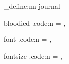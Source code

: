 \newif\ifjournalbloodied
\journalbloodiedfalse

\newcommand{\journalfont}{\entryfont}
\newcommand{\journalfontsize}{11pt}

\newlength{\journalwidth}
\setlength{\journalwidth}{0.9\textheight}

\newlength{\journaltextlength}
\setlength{\journaltextlength}{.35\journalwidth}

\newcommand{\leftsiderotation}{1}
\newlength{\leftsidexoffset}
\setlength{\leftsidexoffset}{.095\journalwidth}
\newlength{\leftsideyoffset}
\setlength{\leftsideyoffset}{.080\journalwidth}

\newcommand{\rightsiderotation}{2}
\newlength{\rightsidexoffset}
\setlength{\rightsidexoffset}{.500\journalwidth}
\newlength{\rightsideyoffset}
\setlength{\rightsideyoffset}{.050\journalwidth}

\newcommand{\journalrotation}{%
	\ifodd\value{page}
		90%
	\else
		-90%
	\fi
}
\ExplSyntaxOn
\keys_define:nn { journal }
{
	bloodied .code:n =
	{
		\journalbloodiedtrue
		\renewcommand{\leftsiderotation}{-2}
		\renewcommand{\rightsiderotation}{0}
		\setlength{\journaltextlength}{.330\journalwidth}
		\setlength{\leftsidexoffset}{.135\journalwidth}
		\setlength{\leftsideyoffset}{.065\journalwidth}
		\setlength{\rightsidexoffset}{.535\journalwidth}
		\setlength{\rightsideyoffset}{.065\journalwidth}
	},
	
	font .code:n =
	{
		\renewcommand{\journalfont}{#1}
	},
	
	fontsize .code:n =
	{
		\renewcommand{\journalfontsize}{#1}
	},
}

